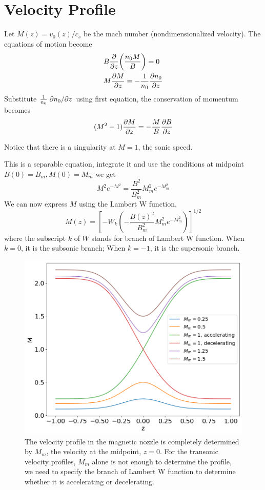 \section{Velocity Profile}
Let $M(z) = v_0(z)/c_s$ be the mach number (nondimensionalized velocity). The equations of motion become
\begin{align*}
	&B\pdv{z}(\frac{n_0M}{B}) = 0\\
	&M\pdv{M}{z} = -\frac{1}{n_0}\pdv{n_0}{z}
\end{align*}
Substitute $\frac{1}{n_0}\pdv*{n_0}{z}$ using first equation, the conservation of momentum becomes
\[ (M^2-1)\pdv{M}{z} = -\frac{M}{B}\pdv{B}{z} \]

Notice that there is a singularity at $M=1$, the sonic speed.

This is a separable equation, integrate it and use the conditions at midpoint $B(0)=B_m, M(0)=M_m$ we get
\[ M^2e^{-M^2} = \frac{B^2}{B_m^2}M_m^2e^{-M_m^2} \]
We can now express $M$ using the Lambert W function,
\[ M(z) = \left[ -W_k\left(-\frac{B(z)^2}{B_m^2}M_m^2e^{-M_m^2}\right) \right]^{1/2} \]
where the subscript $k$ of $W$ stands for branch of Lambert W function. When $k=0$, it is the subsonic branch; When $k=-1$, it is the supersonic branch.
\begin{figure}[H]
	\centering
	\includegraphics[width=0.7\linewidth]{img/velocity-profiles}
	\caption{The velocity profile in the magnetic nozzle is completely determined by $M_m$, the velocity at the midpoint, $z=0$. For the transonic velocity profiles, $M_m$ alone is not enough to determine the profile, we need to specify the branch of Lambert W function to determine whether it is accelerating or decelerating.}
	\label{fig:velocity-profiles}
\end{figure}





